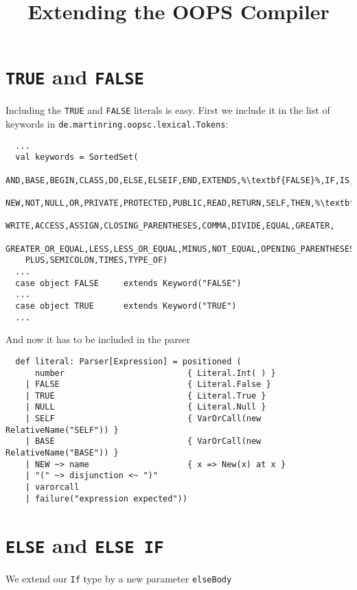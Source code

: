 \documentclass{style}
\title{Extending the OOPS Compiler}
\begin{document}
\maketitle

 
\section{\texttt{TRUE} and \texttt{FALSE}}

Including the \texttt{TRUE} and \texttt{FALSE} literals is easy. First we include it in the list of keywords in \texttt{de.martinring.oopsc.lexical.Tokens}:

\begin{lstlisting}
  ...  
  val keywords = SortedSet(
    AND,BASE,BEGIN,CLASS,DO,ELSE,ELSEIF,END,EXTENDS,%\textbf{FALSE}%,IF,IS,ISA,METHOD,MOD,
    NEW,NOT,NULL,OR,PRIVATE,PROTECTED,PUBLIC,READ,RETURN,SELF,THEN,%\textbf{TRUE}%,WHILE,
    WRITE,ACCESS,ASSIGN,CLOSING_PARENTHESES,COMMA,DIVIDE,EQUAL,GREATER,
    GREATER_OR_EQUAL,LESS,LESS_OR_EQUAL,MINUS,NOT_EQUAL,OPENING_PARENTHESES,
    PLUS,SEMICOLON,TIMES,TYPE_OF)
  ...  
  case object FALSE     extends Keyword("FALSE")
  ...
  case object TRUE      extends Keyword("TRUE")
  ...

\end{lstlisting}

And now it has to be included in the parser

\begin{lstlisting}
  def literal: Parser[Expression] = positioned (
      number                         { Literal.Int( ) }
    | FALSE                          { Literal.False }
    | TRUE                           { Literal.True }
    | NULL                           { Literal.Null }
    | SELF                           { VarOrCall(new RelativeName("SELF")) }
    | BASE                           { VarOrCall(new RelativeName("BASE")) }
    | NEW ~> name                    { x => New(x) at x }
    | "(" ~> disjunction <~ ")"
    | varorcall 
    | failure("expression expected"))

\end{lstlisting}

\section{\texttt{ELSE} and \texttt{ELSE IF}}

We extend our \texttt{If} type by a new parameter \texttt{elseBody}
\end{document}
